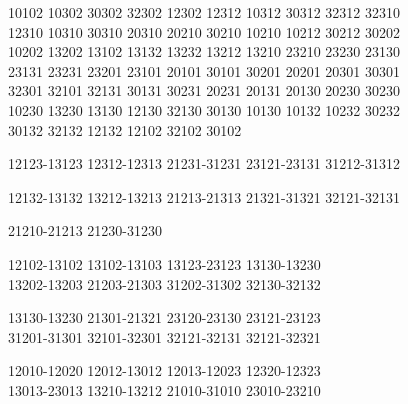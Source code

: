\begingroup\small\ttfamily\begin{flushleft}
10102 10302 30302 32302 12302 12312 10312 30312 32312 32310\\
12310 10310 30310 20310 20210 30210 10210 10212 30212 30202\\
10202 13202 13102 13132 13232 13212 13210 23210 23230 23130\\
23131 23231 23201 23101 20101 30101 30201 20201 20301 30301\\
32301 32101 32131 30131 30231 20231 20131 20130 20230 30230\\
10230 13230 13130 12130 32130 30130 10130 10132 10232 30232\\
30132 32132 12132 12102 32102 30102\\
\end{flushleft}\endgroup
\begingroup\footnotesize\ttfamily\begin{flushleft}
12123-13123 12312-12313 21231-31231 23121-23131 31212-31312\\
\end{flushleft}\endgroup
\begingroup\footnotesize\ttfamily\begin{flushleft}
12132-13132 13212-13213 21213-21313 21321-31321 32121-32131\\
\end{flushleft}\endgroup
\begingroup\footnotesize\ttfamily\begin{flushleft}
21210-21213 21230-31230\\
\end{flushleft}\endgroup
\begingroup\footnotesize\ttfamily\begin{flushleft}
12102-13102 13102-13103 13123-23123 13130-13230\\
13202-13203 21203-21303 31202-31302 32130-32132\\
\end{flushleft}\endgroup
\begingroup\footnotesize\ttfamily\begin{flushleft}
13130-13230 21301-21321 23120-23130 23121-23123\\
31201-31301 32101-32301 32121-32131 32121-32321\\
\end{flushleft}\endgroup
\begingroup\footnotesize\ttfamily\begin{flushleft}
12010-12020 12012-13012 12013-12023 12320-12323\\
13013-23013 13210-13212 21010-31010 23010-23210\\
\end{flushleft}\endgroup
